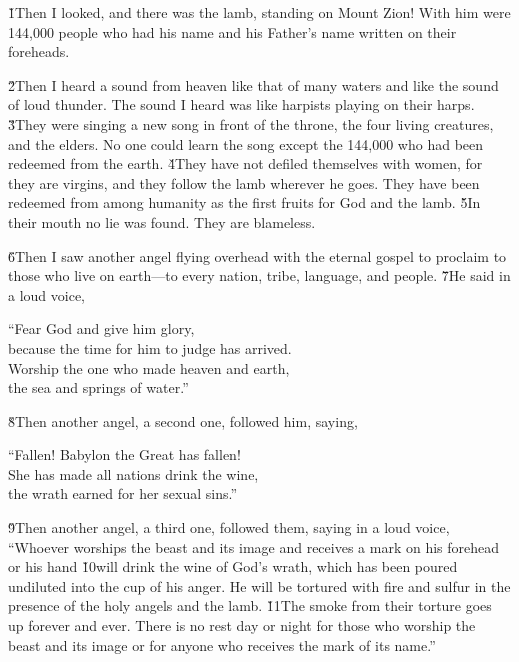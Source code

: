 \v{1}Then I looked, and there was the lamb, standing on Mount Zion! With him were 144,000 people who had his name and his Father's name written on their foreheads.

\v{2}Then I heard a sound from heaven like that of many waters and like the sound of loud thunder. The sound I heard was like harpists playing on their harps. \v{3}They were singing a new song in front of the throne, the four living creatures, and the elders. No one could learn the song except the 144,000 who had been redeemed from the earth. \v{4}They have not defiled themselves with women, for they are virgins, and they follow the lamb wherever he goes. They have been redeemed from among humanity as the first fruits for God and the lamb. \v{5}In their mouth no lie was found. They are blameless.

\v{6}Then I saw another angel flying overhead with the eternal gospel to proclaim to those who live on earth---to every nation, tribe, language, and people. \v{7}He said in a loud voice,

\begin{poetry}
\poeml ``Fear God and give him glory, \\
\poemll    because the time for him to judge has arrived. \\
\poeml Worship the one who made heaven and earth, \\
\poemll    the sea and springs of water.''
\end{poetry}

\v{8}Then another angel, a second one, followed him, saying,

\begin{poetry}
\poeml ``Fallen! Babylon the Great has fallen! \\
\poemll    She has made all nations drink the wine, \\
\poemlll       the wrath earned for her sexual sins.''
\end{poetry}

\v{9}Then another angel, a third one, followed them, saying in a loud voice, ``Whoever worships the beast and its image and receives a mark on his forehead or his hand \v{10}will drink the wine of God's wrath, which has been poured undiluted into the cup of his anger. He will be tortured with fire and sulfur in the presence of the holy angels and the lamb. \v{11}The smoke from their torture goes up forever and ever. There is no rest day or night for those who worship the beast and its image or for anyone who receives the mark of its name.''

